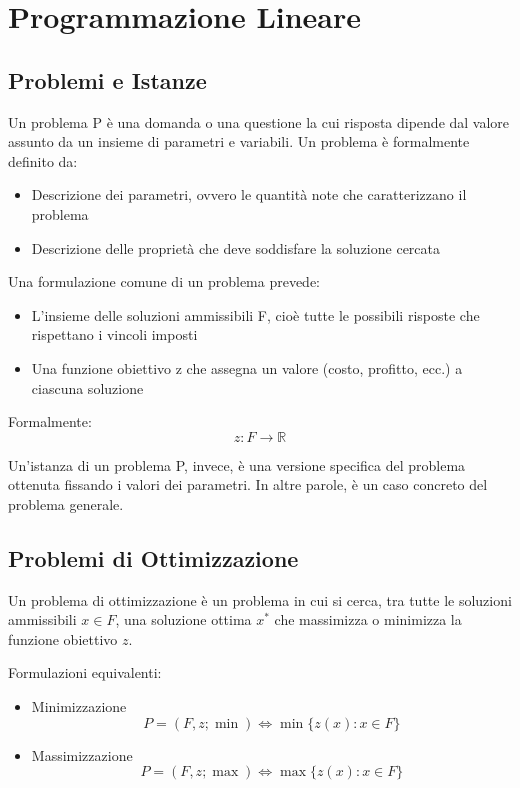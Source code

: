 \chapter{Programmazione Lineare}
\section{Problemi e Istanze}
Un problema P è una domanda o una questione la cui risposta dipende dal valore assunto da un insieme di parametri e variabili.
Un problema è formalmente definito da:
\begin{itemize}
    \item Descrizione dei parametri, ovvero le quantità note che caratterizzano il problema
    \item Descrizione delle proprietà che deve soddisfare la soluzione cercata
\end{itemize}

Una formulazione comune di un problema prevede:

\begin{itemize}
    \item L'insieme delle soluzioni ammissibili F, cioè tutte le possibili risposte che rispettano i vincoli imposti
    \item Una funzione obiettivo z che assegna un valore (costo, profitto, ecc.) a ciascuna soluzione
\end{itemize}

Formalmente:
\[
z \colon F \rightarrow \mathbb{R}
\]

Un'istanza di un problema P, invece, è una versione specifica del problema ottenuta fissando i valori dei parametri. In altre parole, è un caso concreto del problema generale.

\section{Problemi di Ottimizzazione}
Un problema di ottimizzazione è un problema in cui si cerca, tra tutte le soluzioni ammissibili $x \in F$, una soluzione ottima $x^*$ che massimizza o minimizza la funzione obiettivo $z$.

Formulazioni equivalenti:

\begin{itemize}

    \item Minimizzazione
    \[
    P = (F, z; \min) \Leftrightarrow \min\{z(x) : x \in F\}
    \]
    \item Massimizzazione
    \[
    P = (F, z; \max) \Leftrightarrow \max\{z(x) : x \in F\}
    \]
\end{itemize}

